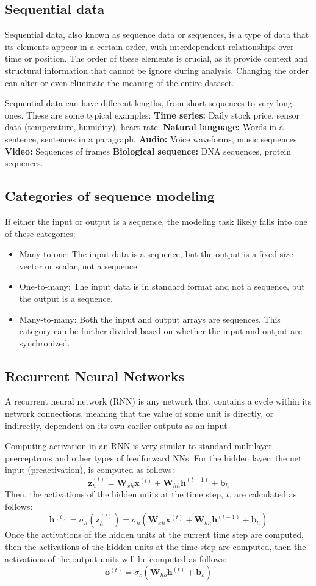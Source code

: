 \subsection{Sequential data}

Sequential data, also known as sequence data or sequences, is a type of data that its elements appear in a certain order, with interdependent relationships over time or position. The order of these elements is crucial, as it provide context and structural information that cannot be ignore during analysis. Changing the order can alter or even eliminate the meaning of the entire dataset. 

Sequential data can have different lengths, from short sequences to very long ones. These are some typical examples:
\textbf{Time series:} Daily stock price, sensor data (temperature, humidity), heart rate.
\textbf{Natural language:} Words in a sentence, sentences in a paragraph.
\textbf{Audio:} Voice waveforms, music sequences.
\textbf{Video:} Sequences of frames
\textbf{Biological sequence:} DNA sequences, protein sequences.

\subsection{Categories of sequence modeling}
If either the input or output is a sequence, the modeling task likely falls into one of these categories:
\begin{itemize}
    \item Many-to-one: The input data is a sequence, but the output is a fixed-size vector or scalar, not a sequence.
    \item One-to-many: The input data is in standard format and not a sequence, but the output is a sequence.
    \item Many-to-many: Both the input and output arrays are sequences. This category can be further divided based on whether the input and output are synchronized.
\end{itemize}

\subsection{Recurrent Neural Networks}
A recurrent neural network (RNN) is any network that contains a cycle within its network connections, meaning that the value of some unit is directly, or indirectly, dependent on its own earlier outputs as an input

Computing activation in an RNN is very similar to standard multilayer peerceptrons and other types of feedforward NNs. For the hidden layer, the net input (preactivation), is computed as follows:
\[\bm{z}_h^{(t)} = \bm{W}_{xh}\bm{x}^{(t)} + \bm{W}_{hh}\bm{h}^{(t-1)} + \bm{b}_h\]
Then, the activations of the hidden units at the time step, $t$, are calculated as follows:
\[\bm{h}^{(t)} = \sigma_h(\bm{z}_h^{(t)}) = \sigma_h(\bm{W}_{xh}\bm{x}^{(t)} + \bm{W}_{hh}\bm{h}^{(t-1)} + \bm{b}_h)\]
Once the activations of the hidden units at the current time step are computed, then the activations of the hidden units at the time step are computed, then the activations of the output units will be computed as follows:
\[\bm{o}^{(t)} = \sigma_o(\bm{W}_{ho}\bm{h}^{(t)} + \bm{b}_o)\]

